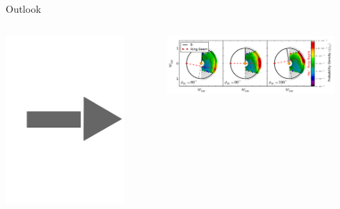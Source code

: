 \documentclass{beamer}
\begin{document}
\begin{frame}{Outlook}
\begin{columns}
		\includegraphics[scale=0.05]{pictures/pfeil_normal.png}
	\column{5.8cm}
		\begin{figure}
			\includegraphics[scale=0.17]{pictures/rvdf}
		\end{figure}
\end{columns}
\begin{columns}
	\column{7cm}
	\begin{figure}[h]
		\centering

\end{figure}
\end{columns}
\end{frame}
\end{document}
